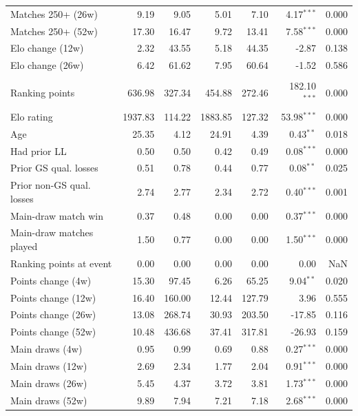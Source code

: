 \begin{tabular}{l rr rr rr}
\quad Matches 250+ (26w) & 9.19 & 9.05 & 5.01 & 7.10 & 4.17$^{***}$ & 0.000 \\
\quad Matches 250+ (52w) & 17.30 & 16.47 & 9.72 & 13.41 & 7.58$^{***}$ & 0.000 \\
\quad Elo change (12w) & 2.32 & 43.55 & 5.18 & 44.35 & -2.87 & 0.138 \\
\quad Elo change (26w) & 6.42 & 61.62 & 7.95 & 60.64 & -1.52 & 0.586 \\
\addlinespace
\multicolumn{7}{l}{\textit{Panel: WTA non-GS (N = 2545, LL = 755, Control = 1790)}} \\
\addlinespace
\quad Ranking points & 636.98 & 327.34 & 454.88 & 272.46 & 182.10$^{***}$ & 0.000 \\
\quad Elo rating & 1937.83 & 114.22 & 1883.85 & 127.32 & 53.98$^{***}$ & 0.000 \\
\quad Age & 25.35 & 4.12 & 24.91 & 4.39 & 0.43$^{**}$ & 0.018 \\
\quad Had prior LL & 0.50 & 0.50 & 0.42 & 0.49 & 0.08$^{***}$ & 0.000 \\
\quad Prior GS qual. losses & 0.51 & 0.78 & 0.44 & 0.77 & 0.08$^{**}$ & 0.025 \\
\quad Prior non-GS qual. losses & 2.74 & 2.77 & 2.34 & 2.72 & 0.40$^{***}$ & 0.001 \\
\quad Main-draw match win & 0.37 & 0.48 & 0.00 & 0.00 & 0.37$^{***}$ & 0.000 \\
\quad Main-draw matches played & 1.50 & 0.77 & 0.00 & 0.00 & 1.50$^{***}$ & 0.000 \\
\quad Ranking points at event & 0.00 & 0.00 & 0.00 & 0.00 & 0.00 & NaN \\
\quad Points change (4w) & 15.30 & 97.45 & 6.26 & 65.25 & 9.04$^{**}$ & 0.020 \\
\quad Points change (12w) & 16.40 & 160.00 & 12.44 & 127.79 & 3.96 & 0.555 \\
\quad Points change (26w) & 13.08 & 268.74 & 30.93 & 203.50 & -17.85 & 0.116 \\
\quad Points change (52w) & 10.48 & 436.68 & 37.41 & 317.81 & -26.93 & 0.159 \\
\quad Main draws (4w) & 0.95 & 0.99 & 0.69 & 0.88 & 0.27$^{***}$ & 0.000 \\
\quad Main draws (12w) & 2.69 & 2.34 & 1.77 & 2.04 & 0.91$^{***}$ & 0.000 \\
\quad Main draws (26w) & 5.45 & 4.37 & 3.72 & 3.81 & 1.73$^{***}$ & 0.000 \\
\quad Main draws (52w) & 9.89 & 7.94 & 7.21 & 7.18 & 2.68$^{***}$ & 0.000 \\

\end{tabular}
